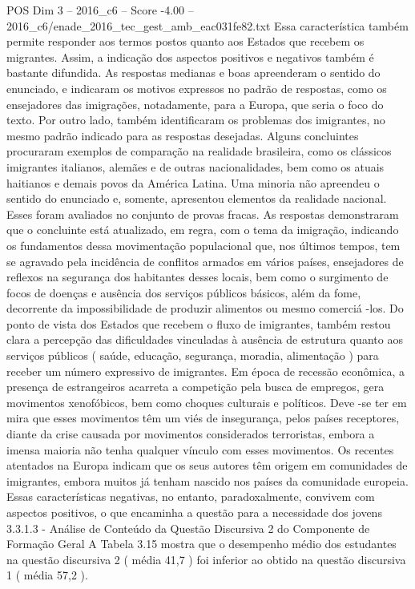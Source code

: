 \begin{textsample}{POS Dim 3 – 2016\_c6 – Score -4.00 – 2016\_c6/enade\_2016\_tec\_gest\_amb\_eac031fe82.txt}
Essa característica também permite responder aos termos postos quanto aos Estados que recebem os migrantes.
Assim, a indicação dos aspectos positivos e negativos também é bastante difundida.
As respostas medianas e boas apreenderam o sentido do enunciado, e indicaram os motivos expressos no padrão de respostas, como os ensejadores das imigrações, notadamente, para a Europa, que seria o foco do texto.
Por outro lado, também identificaram os problemas dos imigrantes, no mesmo padrão indicado para as respostas desejadas.
Alguns concluintes procuraram exemplos de comparação na realidade brasileira, como os clássicos imigrantes italianos, alemães e de outras nacionalidades, bem como os atuais haitianos e demais povos da América Latina.
Uma minoria não apreendeu o sentido do enunciado e, somente, apresentou elementos da realidade nacional.
Esses foram avaliados no conjunto de provas fracas.
As respostas demonstraram que o concluinte está atualizado, em regra, com o tema da imigração, indicando os fundamentos dessa movimentação populacional que, nos últimos tempos, tem se agravado pela incidência de conflitos armados em vários países, ensejadores de reflexos na segurança dos habitantes desses locais, bem como o surgimento de focos de doenças e ausência dos serviços públicos básicos, além da fome, decorrente da impossibilidade de produzir alimentos ou mesmo comerciá -los.
Do ponto de vista dos Estados que recebem o fluxo de imigrantes, também restou clara a percepção das dificuldades vinculadas à ausência de estrutura quanto aos serviços públicos ( saúde, educação, segurança, moradia, alimentação ) para receber um número expressivo de imigrantes.
Em época de recessão econômica, a presença de estrangeiros acarreta a competição pela busca de empregos, gera movimentos xenofóbicos, bem como choques culturais e políticos.
Deve -se ter em mira que esses movimentos têm um viés de insegurança, pelos países receptores, diante da crise causada por movimentos considerados terroristas, embora a imensa maioria não tenha qualquer vínculo com esses movimentos.
Os recentes atentados na Europa indicam que os seus autores têm origem em comunidades de imigrantes, embora muitos já tenham nascido nos países da comunidade europeia.
Essas características negativas, no entanto, paradoxalmente, convivem com aspectos positivos, o que encaminha a questão para a necessidade dos jovens 3.3.1.3 - Análise de Conteúdo da Questão Discursiva 2 do Componente de Formação Geral A Tabela 3.15 mostra que o desempenho médio dos estudantes na questão discursiva 2 ( média 41,7 ) foi inferior ao obtido na questão discursiva 1 ( média 57,2 ).

\end{textsample}
